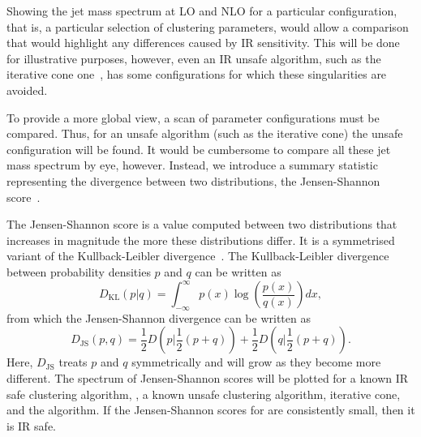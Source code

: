     Showing the jet mass spectrum at LO and NLO for a particular configuration,
    that is, a particular selection of clustering parameters,
    would allow a comparison that would highlight any differences caused by IR sensitivity.
    This will be done for illustrative purposes,
    however, even an IR unsafe algorithm, such as the iterative cone one~\cite{cacciari_antikt2018},
     has some configurations for which these singularities are avoided.

    To provide a more global view, a scan of parameter configurations must be compared.
    Thus, for an unsafe algorithm (such as the iterative cone) the unsafe configuration
    will be found.
    It would be cumbersome to compare all these jet mass spectrum by eye, however.
    Instead, we introduce a summary statistic representing the divergence between two distributions,
    the Jensen-Shannon score~\cite{jensen_shannon}.

    The Jensen-Shannon score is a value computed between two distributions that increases in magnitude the more these distributions differ.
    It is a symmetrised variant of the Kullback-Leibler divergence~\cite{jensen_shannon}.
    The Kullback-Leibler divergence between probability densities \(p\) and \(q\) can be written as
    \begin{equation}
    D_\text{KL} (p | q) = \int^{\infty}_{-\infty} p(x) \log\left(\frac{p(x)}{q(x)}\right) dx,
\end{equation}
    from which the Jensen-Shannon divergence can be written as
    \begin{equation}
    D_\text{JS}(p, q) = \frac{1}{2}D\left(p | \frac{1}{2}(p + q)\right) + \frac{1}{2}D\left(q | \frac{1}{2}(p + q)\right).
\end{equation}
    Here, \(D_\text{JS}\) treats \(p\) and \(q\) symmetrically and will grow as they become more different.
    The spectrum of Jensen-Shannon scores will be plotted for a known IR safe clustering algorithm, \antikt{},
    a known unsafe clustering algorithm, iterative cone, and the \spectral{} algorithm.
    If the Jensen-Shannon scores for \spectral{} are consistently small,
    then it is IR safe.

